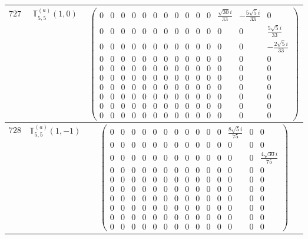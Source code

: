 \documentclass[fleqn,8pt,landscape]{jsarticle}
\begin{document}
\begin{center}
\begin{longtable}{ccc}
$ 727 $ & $ \mathbb{T}_{5,5}^{(a)}(1,0) $ & $ \begin{pmatrix} 0 & 0 & 0 & 0 & 0 & 0 & 0 & 0 & 0 & 0 & 0 & \frac{\sqrt{30} i}{33} & - \frac{5 \sqrt{5} i}{33} & 0 \\ 0 & 0 & 0 & 0 & 0 & 0 & 0 & 0 & 0 & 0 & 0 & 0 & 0 & \frac{5 \sqrt{5} i}{33} \\ 0 & 0 & 0 & 0 & 0 & 0 & 0 & 0 & 0 & 0 & 0 & 0 & 0 & - \frac{2 \sqrt{5} i}{33} \\ 0 & 0 & 0 & 0 & 0 & 0 & 0 & 0 & 0 & 0 & 0 & 0 & 0 & 0 \\ 0 & 0 & 0 & 0 & 0 & 0 & 0 & 0 & 0 & 0 & 0 & 0 & 0 & 0 \\ 0 & 0 & 0 & 0 & 0 & 0 & 0 & 0 & 0 & 0 & 0 & 0 & 0 & 0 \\ 0 & 0 & 0 & 0 & 0 & 0 & 0 & 0 & 0 & 0 & 0 & 0 & 0 & 0 \\ 0 & 0 & 0 & 0 & 0 & 0 & 0 & 0 & 0 & 0 & 0 & 0 & 0 & 0 \\ 0 & 0 & 0 & 0 & 0 & 0 & 0 & 0 & 0 & 0 & 0 & 0 & 0 & 0 \\ 0 & 0 & 0 & 0 & 0 & 0 & 0 & 0 & 0 & 0 & 0 & 0 & 0 & 0 \end{pmatrix} $ \\ \hline
$ 728 $ & $ \mathbb{T}_{5,5}^{(a)}(1,-1) $ & $ \begin{pmatrix} 0 & 0 & 0 & 0 & 0 & 0 & 0 & 0 & 0 & 0 & 0 & \frac{8 \sqrt{5} i}{75} & 0 & 0 \\ 0 & 0 & 0 & 0 & 0 & 0 & 0 & 0 & 0 & 0 & 0 & 0 & 0 & 0 \\ 0 & 0 & 0 & 0 & 0 & 0 & 0 & 0 & 0 & 0 & 0 & 0 & 0 & \frac{4 \sqrt{30} i}{75} \\ 0 & 0 & 0 & 0 & 0 & 0 & 0 & 0 & 0 & 0 & 0 & 0 & 0 & 0 \\ 0 & 0 & 0 & 0 & 0 & 0 & 0 & 0 & 0 & 0 & 0 & 0 & 0 & 0 \\ 0 & 0 & 0 & 0 & 0 & 0 & 0 & 0 & 0 & 0 & 0 & 0 & 0 & 0 \\ 0 & 0 & 0 & 0 & 0 & 0 & 0 & 0 & 0 & 0 & 0 & 0 & 0 & 0 \\ 0 & 0 & 0 & 0 & 0 & 0 & 0 & 0 & 0 & 0 & 0 & 0 & 0 & 0 \\ 0 & 0 & 0 & 0 & 0 & 0 & 0 & 0 & 0 & 0 & 0 & 0 & 0 & 0 \\ 0 & 0 & 0 & 0 & 0 & 0 & 0 & 0 & 0 & 0 & 0 & 0 & 0 & 0 \end{pmatrix} $ \\ \hline

\end{longtable}
\end{center}
\end{document}
